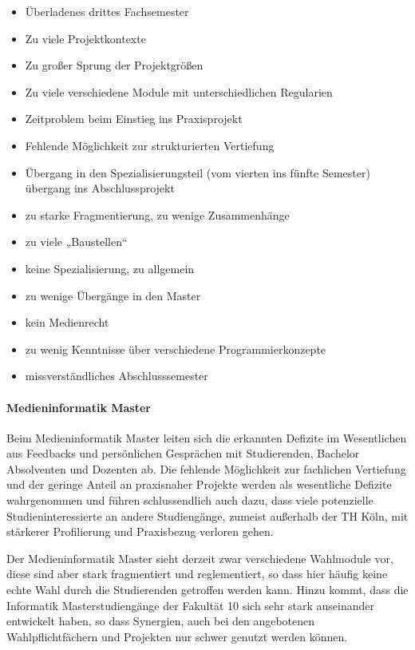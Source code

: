 \begin{itemize}
\tightlist
\item
  Überladenes drittes Fachsemester
\item
  Zu viele Projektkontexte
\item
  Zu großer Sprung der Projektgrößen
\item
  Zu viele verschiedene Module mit unterschiedlichen Regularien
\item
  Zeitproblem beim Einstieg ins Praxisprojekt
\item
  Fehlende Möglichkeit zur strukturierten Vertiefung
\item
  Übergang in den Spezialisierungsteil (vom vierten ins fünfte Semester)
  übergang ins Abschlussprojekt
\item
  zu starke Fragmentierung, zu wenige Zusammenhänge
\item
  zu viele „Baustellen``
\item
  keine Spezialisierung, zu allgemein
\item
  zu wenige Übergänge in den Master
\item
  kein Medienrecht
\item
  zu wenig Kenntnisse über verschiedene Programmierkonzepte
\item
  missverständliches Abschlusssemester
\end{itemize}

\paragraph{Medieninformatik Master}\label{medieninformatik-master}

Beim Medieninformatik Master leiten sich die erkannten Defizite im
Wesentlichen aus Feedbacks und persönlichen Gesprächen mit Studierenden,
Bachelor Absolventen und Dozenten ab. Die fehlende Möglichkeit zur
fachlichen Vertiefung und der geringe Anteil an praxisnaher Projekte
werden als wesentliche Defizite wahrgenommen und führen schlussendlich
auch dazu, dass viele potenzielle Studieninteressierte an andere
Studiengänge, zumeist außerhalb der TH Köln, mit stärkerer Profilierung
und Praxisbezug verloren gehen.

Der Medieninformatik Master sieht derzeit zwar verschiedene Wahlmodule
vor, diese sind aber stark fragmentiert und reglementiert, so dass hier
häufig keine echte Wahl durch die Studierenden getroffen werden kann.
Hinzu kommt, dass die Informatik Masterstudiengänge der Fakultät 10 sich
sehr stark auseinander entwickelt haben, so dass Synergien, auch bei den
angebotenen Wahlpflichtfächern und Projekten nur schwer genutzt werden
können.

